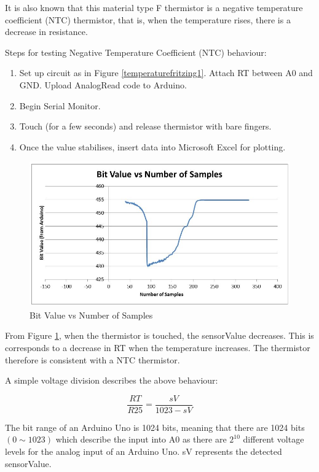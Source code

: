 It is also known that this material type F thermistor is a negative temperature coefficient (NTC) thermistor, that is, when the temperature rises, there is a decrease in resistance. 

Steps for testing Negative Temperature Coefficient (NTC) behaviour: 
\begin{enumerate}
	\item Set up circuit as in Figure \ref{temperaturefritzing1}. Attach RT between A0 and GND. Upload AnalogRead code to Arduino. 
	\item Begin Serial Monitor.
	\item Touch (for a few seconds) and release thermistor with bare fingers. 
	\item Once the value stabilises, insert data into Microsoft Excel for plotting. 
\end{enumerate}

\begin{figure}[H]
	\centering
	\includegraphics[width=0.8\linewidth]{thermistor1.jpg}
	\caption{Bit Value vs Number of Samples}
	\label{bitvaluevssamples}
\end{figure}

From Figure \ref{bitvaluevssamples}, when the thermistor is touched, the sensorValue decreases. This is corresponds to a decrease in RT when the temperature increases. The thermistor therefore is consistent with a NTC thermistor. 

A simple voltage division describes the above behaviour: 

\begin{equation}
	\frac{RT}{R25}=\frac{sV}{1023-sV}
	\label{thermistorresistance3}
\end{equation}

The bit range of an Arduino Uno is 1024 bits, meaning that there are 1024 bits $(0\sim 1023)$ which describe the input into A0 as there are $2^{10}$ different voltage levels for the analog input of an Arduino Uno. sV represents the detected sensorValue. 


